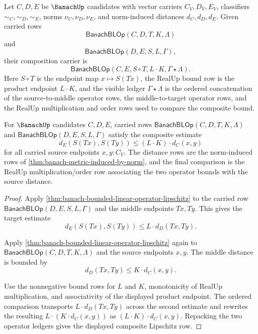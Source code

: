 \begin{definition}
\label{def:banach-bounded-linear-operator-composition-carrier}
Let $C,D,E$ be $\BanachUp$ candidates with vector carriers $C_V,D_V,E_V$,
classifiers $\sim_C,\sim_D,\sim_E$, norms $\nu_C,\nu_D,\nu_E$, and
norm-induced distances $d_C,d_D,d_E$. Given carried rows
$$
\mathsf{BanachBLOp}(C,D,T,K,\Lambda)
$$
and
$$
\mathsf{BanachBLOp}(D,E,S,L,\Gamma),
$$
their composition carrier is
$$
\mathsf{BanachBLOp}(C,E,S\circ T,L\cdot K,\Gamma\star\Lambda).
$$
Here $S\circ T$ is the endpoint map $x\mapsto S(Tx)$, the RealUp bound row is
the product endpoint $L\cdot K$, and the visible ledger
$\Gamma\star\Lambda$ is the ordered concatenation of the source-to-middle
operator rows, the middle-to-target operator rows, and the RealUp
multiplication and order rows used to compare the composite bound.
\end{definition}

\begin{theorem}
\label{thm:banach-bounded-linear-operator-composition-lipschitz}
For $\BanachUp$ candidates $C,D,E$, carried rows
$\mathsf{BanachBLOp}(C,D,T,K,\Lambda)$ and
$\mathsf{BanachBLOp}(D,E,S,L,\Gamma)$ satisfy the composite estimate
$$
d_E(S(Tx),S(Ty))\le (L\cdot K)\cdot d_C(x,y)
$$
for all carried source endpoints $x,y:C_V$. The distance rows are the
norm-induced rows of \autoref{thm:banach-metric-induced-by-norm}, and the
final comparison is the RealUp multiplication/order row associating the two
operator bounds with the source distance.
\end{theorem}
\begin{proof}
Apply \autoref{thm:banach-bounded-linear-operator-lipschitz} to the carried
row $\mathsf{BanachBLOp}(D,E,S,L,\Gamma)$ and the middle endpoints $Tx,Ty$.
This gives the target estimate
$$
d_E(S(Tx),S(Ty))\le L\cdot d_D(Tx,Ty).
$$

Apply \autoref{thm:banach-bounded-linear-operator-lipschitz} again to
$\mathsf{BanachBLOp}(C,D,T,K,\Lambda)$ and the source endpoints $x,y$. The
middle distance is bounded by
$$
d_D(Tx,Ty)\le K\cdot d_C(x,y).
$$

Use the nonnegative bound rows for $L$ and $K$, monotonicity of RealUp
multiplication, and associativity of the displayed product endpoint. The
ordered comparison transports
$L\cdot d_D(Tx,Ty)$ across the second estimate and rewrites the resulting
$L\cdot(K\cdot d_C(x,y))$ as $(L\cdot K)\cdot d_C(x,y)$. Repacking the two
operator ledgers gives the displayed composite Lipschitz row.
\end{proof}

